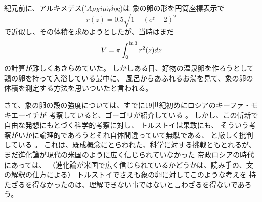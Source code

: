 \documentclass[11pt,a4paper,twoside]{jarticle}
\newcommand{\研究種別}{A}	%
\newcommand{\研究課題名}{Co-Creativeなソフトウェア開発手法向けPBL教材}
\newcommand{\研究機関名}{産業技術大学院大学}
\newcommand{\研究代表者氏名}{中鉢　欣秀}
\newcommand{\研究代表者氏名ふりがな}{ちゅうばち　よしひで}
\newcommand{\本応募effort}{\KLEffort{18}}	%
\newcommand{\研究期間の最終元号年度}{27}	%
\begin{document}
{         紀元前に、アルキメデス(\('A\rho\chi i\mu\acute{\eta}\delta\eta\mbox{\c{c}}\))は
	象の卵の形を円筒座標表示で
         \[r(z) = 0.5\sqrt{1-(e^z-2)^2}\]
         で近似し、その体積を求めようとしたが、当時はまだ
         \begin{equation}
	         V  = \pi \int_0^{\ln 3} r^2(z) dz\\
         \end{equation}
         の計算が難しくあきらめていた。
         しかしある日、好物の温泉卵を作ろうとして鶏の卵を持って入浴している最中に、
         風呂からあふれるお湯を見て、象の卵の体積を測定する方法を思いついたと言われる。
 
	さて、象の卵の殻の強度については、すでに19世紀初めにロシアのキーファ・モキエーイチが
	考察していると、ゴーゴリが紹介している
	\cite{gogori}。
	しかし、この斬新で自由な発想にもとづく科学的考察に対し、
	トルストイは果敢にも、
	そういう考察がいかに論理的であろうとそれ自体間違っていて無駄である、
	と厳しく批判している
	\cite{torusutoi}。
	これは、既成概念にとらわれた、科学に対する挑戦ともとれるが、
	まだ進化論が現代の米国のように広く信じられていなかった
	帝政ロシアの時代にあっては、
	（進化論が米国で広く信じられているかどうかは、読み手の、文の解釈の仕方による）
	トルストイでさえも象の卵に対してこのような考えを
	持たざるを得なかったのは、理解できない事ではないと言わざるを得ないであろう。
	
}
\end{document}
